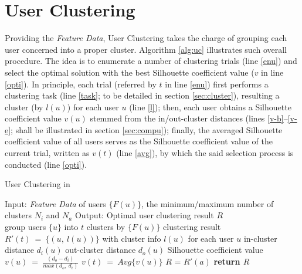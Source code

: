 \section{User Clustering}
\label{sec:uc}


Providing the \textit{Feature Data}, User Clustering takes the charge of grouping each user concerned into a proper cluster.
Algorithm \ref{alg:uc} illustrates such overall procedure.
%
The idea is to enumerate a number of clustering trials (line \ref{enu}) and select the optimal solution with the best Silhouette coefficient value ($v$ in line \ref{opti}).
In principle, each trial (referred by $t$ in line \ref{enu}) first performs a clustering task (line \ref{task}; to be detailed in section \ref{sec:cluster}), resulting a cluster (by $l(u)$) for each user $u$ (line \ref{l});
then, each user obtains a Silhouette coefficient value $v(u)$ stemmed from the in/out-cluster distances (lines \ref{v-b}--\ref{v-e}; shall be illustrated in section \ref{sec:compu});
finally, the averaged Silhouette coefficient value of all users serves as the Silhouette coefficient value of the current trial, written as $v(t)$ (line \ref{avg}), by which the said selection process is conducted (line \ref{opti}).


\begin{algorithm}[t]
\begin{small}
\caption{User Clustering in \sys{}}
\label{alg:uc}

\begin{algorithmic}[1]
\State Input: \textit{Feature Data} of users $\{F(u)\}$, the minimum/maximum number of clusters $N_i$ and $N_a$
\State Output: Optimal user clustering result $R$
\\
 \label{enu}
	\State group users $\{u\}$ into $t$ clusters by $\{F(u)\}$ \label{task}
	\State clustering result $R'(t)\ =\ \{(u,\ l(u))\}$ with cluster info $l(u)$ for each user $u$ \label{l}
		\State in-cluster distance $d_i(u)$ \label{v-b}
		\State out-cluster distance $d_o(u)$
		\State Silhouette coefficient value $v(u)\ =\ \frac{(d_o - d_i)}{max(d_o,\ d_i)}$ \label{v-e}
	\EndFor
	\State $v(t)\ =\ Avg\{v(u)\}$ \label{avg}
\EndFor
{} \label{opti}
	\State $R$ = $R'(a)$
\EndIf
\State \bfseries{return} $R$
\end{algorithmic}
\end{small}
\end{algorithm}

